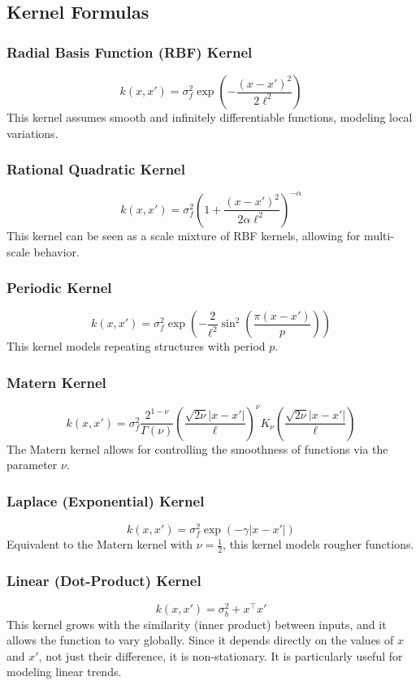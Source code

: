 \documentclass{ucdgradtaughtthesis}
\begin{document}
\subsection{Kernel Formulas}
\label{appendix:B}
\subsubsection*{Radial Basis Function (RBF) Kernel}
\[
k(x, x') = \sigma_f^2 \exp\left( -\frac{(x - x')^2}{2\ell^2} \right)
\]
This kernel assumes smooth and infinitely differentiable functions, modeling local variations.


\subsubsection*{Rational Quadratic Kernel}
\[
k(x, x') = \sigma_f^2 \left( 1 + \frac{(x - x')^2}{2 \alpha \ell^2} \right)^{-\alpha}
\]
This kernel can be seen as a scale mixture of RBF kernels, allowing for multi-scale behavior.


\subsubsection*{Periodic Kernel}
\[
k(x, x') = \sigma_f^2 \exp\left( -\frac{2}{\ell^2} \sin^2\left( \frac{\pi (x - x')}{p} \right) \right)
\]
This kernel models repeating structures with period \( p \).

\subsubsection*{Matern Kernel}
\[
k(x, x') = \sigma_f^2 \frac{2^{1-\nu}}{\Gamma(\nu)} \left( \frac{\sqrt{2\nu} |x - x'|}{\ell} \right)^\nu K_\nu\left( \frac{\sqrt{2\nu} |x - x'|}{\ell} \right)
\]
The Matern kernel allows for controlling the smoothness of functions via the parameter \( \nu \).


\subsubsection*{Laplace (Exponential) Kernel}
\[
k(x, x') = \sigma_f^2 \exp\left( -\gamma |x - x'| \right)
\]
Equivalent to the Matern kernel with \( \nu = \frac{1}{2} \), this kernel models rougher functions.


\subsubsection*{Linear (Dot-Product) Kernel}
\[
k(x, x') = \sigma_b^2 + x^\top x'
\]
This kernel grows with the similarity (inner product) between inputs, and it allows the function to vary globally. Since it depends directly on the values of \( x \) and \( x' \), not just their difference, it is non-stationary. It is particularly useful for modeling linear trends.
\end{document}

